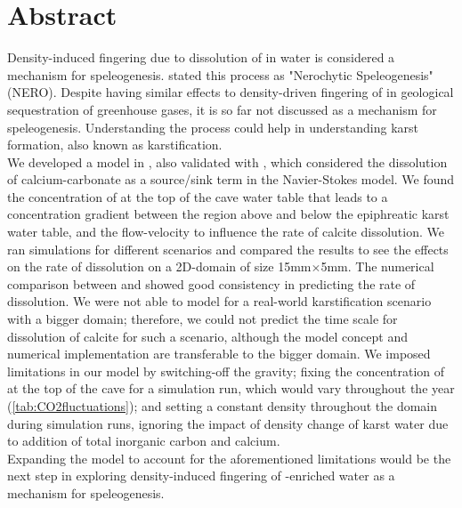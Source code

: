 \chapter*{Abstract}
\thispagestyle{empty}
Density-induced fingering due to dissolution of  in water is considered a mechanism for 
speleogenesis. \citet{Scherzer2017} stated this process as "Nerochytic Speleogenesis" (NERO). 
Despite having similar effects to density-driven fingering of  in geological sequestration 
of greenhouse gases, it is so far not discussed as a mechanism for speleogenesis. Understanding the 
process could help in understanding karst formation, also known as karstification.\\

We developed a model in \DuMuX, also validated with \MATLAB, which considered the dissolution of calcium-carbonate 
as a source/sink term in the Navier-Stokes model. We found the concentration of  at the top of 
the cave water table that leads to a concentration gradient between the region above and below the epiphreatic karst water table, 
and the flow-velocity to influence the rate of calcite dissolution. We ran simulations for different 
scenarios and compared the results to see the effects on the rate of dissolution on a 2D-domain of  size 15mm$\times$5mm. 
The numerical comparison between \DuMuX and \MATLAB showed good consistency in predicting the rate of dissolution. 
We were not able to model for a real-world karstification scenario with a bigger domain; therefore, we could not 
predict the time scale for dissolution of calcite for such a scenario, although the model concept and numerical 
implementation are transferable to the bigger domain. We imposed limitations in our model by switching-off the 
gravity; fixing the concentration of  at the top of the cave for a simulation run, which would vary throughout the year (\cref{tab:CO2fluctuations}); and 
setting a constant density throughout the domain during simulation runs, ignoring the impact of density change of karst 
water due to addition of total inorganic carbon and calcium.\\

Expanding the model to account for the aforementioned limitations would be the next step in exploring density-induced 
fingering of -enriched water as a mechanism for speleogenesis.

\endinput